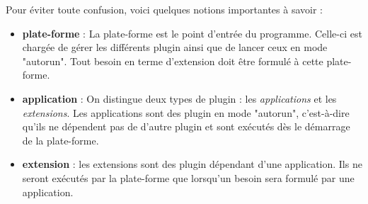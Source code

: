 \documentclass[11pt]{article}
\begin{document}
    Pour éviter toute confusion, voici quelques notions importantes à savoir :
    \begin{itemize}
        \item \textbf{plate-forme} : La plate-forme est le point d'entrée du programme. Celle-ci est chargée de gérer les différents plugin ainsi que de lancer ceux en mode "autorun". Tout besoin en terme d'extension doit être formulé à cette plate-forme.
        
        \item \textbf{application} : On distingue deux types de plugin : les \textit{applications} et les \textit{extensions}. Les applications sont des plugin en mode "autorun", c'est-à-dire qu'ils ne dépendent pas de d'autre plugin et sont exécutés dès le démarrage de la plate-forme.
        
        \item \textbf{extension} : les extensions sont des plugin dépendant d'une application. Ils ne seront exécutés par la plate-forme que lorsqu'un besoin sera formulé par une application.   
    \end{itemize}




\end{document}
